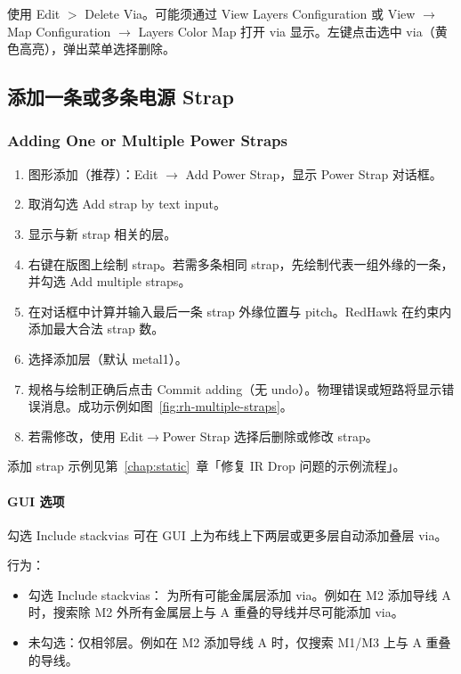 使用 Edit $>$ Delete Via。可能须通过 View Layers Configuration 或 View $\rightarrow$ Map Configuration $\rightarrow$ Layers Color Map 打开 via 显示。左键点击选中 via（黄色高亮），弹出菜单选择删除。

\subsection{添加一条或多条电源 Strap}
\subsubsection*{Adding One or Multiple Power Straps}

\begin{enumerate}
  \item 图形添加（推荐）：Edit $\rightarrow$ Add Power Strap，显示 Power Strap 对话框。
  \item 取消勾选 Add strap by text input。
  \item 显示与新 strap 相关的层。
  \item 右键在版图上绘制 strap。若需多条相同 strap，先绘制代表一组外缘的一条，并勾选 Add multiple straps。
  \item 在对话框中计算并输入最后一条 strap 外缘位置与 pitch。RedHawk 在约束内添加最大合法 strap 数。
  \item 选择添加层（默认 metal1）。
  \item 规格与绘制正确后点击 Commit adding（无 undo）。物理错误或短路将显示错误消息。成功示例如图~\ref{fig:rh-multiple-straps}。
  \item 若需修改，使用 Edit$\rightarrow$Power Strap 选择后删除或修改 strap。
\end{enumerate}


\label{fig:rh-multiple-straps}

添加 strap 示例见第~\ref{chap:static}~章「修复 IR Drop 问题的示例流程」。

\paragraph{GUI 选项 }
勾选 Include stackvias 可在 GUI 上为布线上下两层或更多层自动添加叠层 via。


行为：
\begin{itemize}
  \item 勾选 Include stackvias： 为所有可能金属层添加 via。例如在 M2 添加导线 A 时，搜索除 M2 外所有金属层上与 A 重叠的导线并尽可能添加 via。
  \item 未勾选：仅相邻层。例如在 M2 添加导线 A 时，仅搜索 M1/M3 上与 A 重叠的导线。
\end{itemize}

